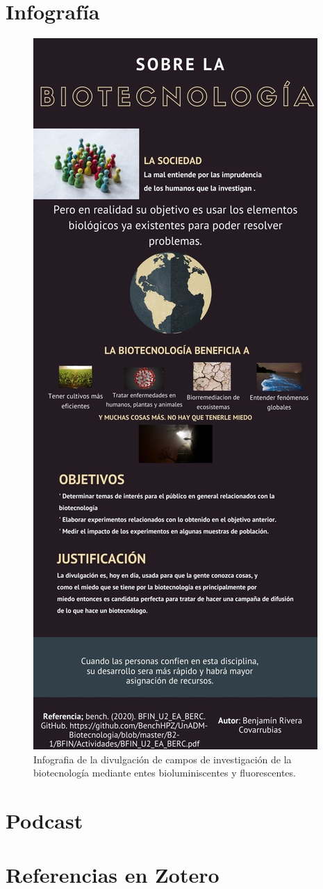 \documentclass[12pt]{article}
\newcommand{\tema}[0]{divulgación de campos de investigación de la biotecnología mediante entes bioluminiscentes y fluorescentes}
\begin{document}
\section{Infografía}
	\begin{figure}[h]
		\centering
			\includegraphics[height=0.7\textheight]{infografia_biotecnologia.jpg}
		\caption{Infografia de la \tema.}
		\label{fig: }
	\end{figure}

\section{Podcast}

\section{Referencias en Zotero}
\end{document}
